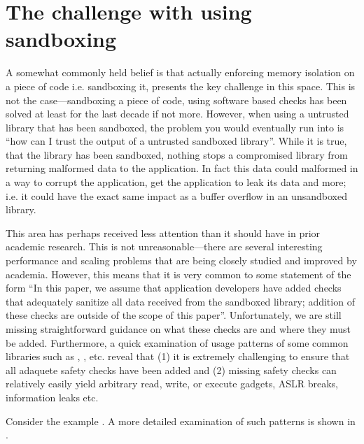 \section{The challenge with using sandboxing}
%

A somewhat commonly held belief is that actually enforcing memory isolation on a piece of code 
i.e. sandboxing it, presents the key challenge in this space.
%
This is not the case---sandboxing a piece of code, using software based checks has been solved 
at least for the last decade if not more.
%
However, when using a untrusted library that has been sandboxed, the problem you would 
eventually run into is ``how can I trust the output of a untrusted sandboxed library''.
%
While it is true, that the library has been sandboxed, nothing stops a compromised library from 
returning malformed data to the application.
%
In fact this data could malformed in a way to corrupt the application, get the application to 
leak its data and more; i.e. it could have the exact same impact as a buffer overflow in an 
unsandboxed library.

This area has perhaps received less attention than it should have in prior academic research.
%
This is not unreasonable---there are several interesting performance and scaling problems that 
are being closely studied and improved by academia.
%
However, this means that it is very common to some statement of the form ``In this paper, we 
assume that application developers have added checks that adequately sanitize all data received 
from the sandboxed library; addition of these checks are outside of the scope of this paper''. 
%
Unfortunately, we are still missing straightforward guidance on what these checks are and where 
they must be added.
%
Furthermore, a quick examination of usage patterns of some common libraries such as \jpeg, 
\png, \vorbis etc. reveal that (1) it is extremely challenging to ensure that all adaquete 
safety checks have been added and (2) missing safety checks can relatively easily yield 
arbitrary read, write, or execute gadgets, ASLR breaks, information leaks etc.

Consider the example \todo{}.
%
A more detailed examination of such patterns is shown in .
